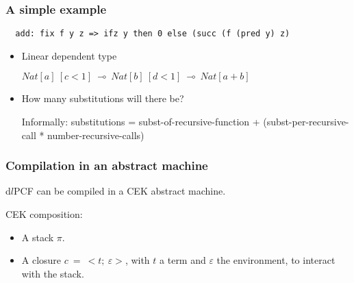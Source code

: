 \documentclass{beamer}
\begin{document}
\begin{frame}[fragile]
\frametitle{A simple example}
\begin{verbatim}
  add: fix f y z => ifz y then 0 else (succ (f (pred y) z)
\end{verbatim}
\begin{itemize}
\item Linear dependent type 

  $Nat[a]~[c < 1]~\multimap~Nat[b]~[d < 1]~\multimap~Nat[a + b]$

\item  How many substitutions will there be? 

  Informally: substitutions = subst-of-recursive-function +
  (subst-per-recursive-call * number-recursive-calls)

\end{itemize}
\end{frame}

\begin{frame}
\frametitle{Compilation in an abstract machine}

d$l$PCF can be compiled in a CEK abstract machine.

\medskip

CEK composition:
\begin{itemize}
\item A stack $\pi$.
\item A closure $c~=~<t;~\varepsilon >$, with $t$ a term and $\varepsilon$ the
  environment, to interact with the stack.
\end{itemize}

\end{frame}
\end{document}

